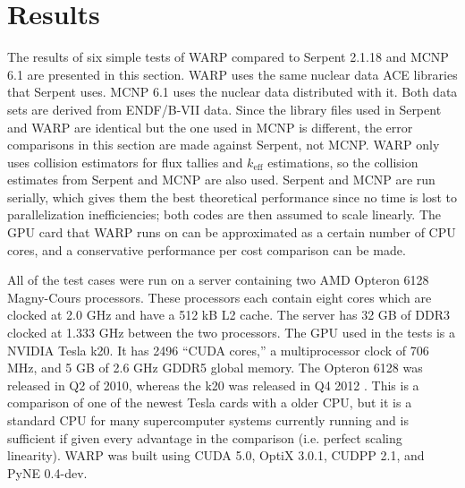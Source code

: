 \chapter{Results}
\label{chap:results}

The results of six simple tests of WARP compared to Serpent 2.1.18 and MCNP 6.1 are presented in this section.  WARP uses the same nuclear data ACE libraries that Serpent uses.  MCNP 6.1 uses the nuclear data distributed with it.  Both data sets are derived from ENDF/B-VII data. Since the library files used in Serpent and WARP are identical but the one used in MCNP is different, the error comparisons in this section are made against Serpent, not MCNP.  WARP only uses collision estimators for flux tallies and $k_\mathrm{eff}$ estimations, so the collision estimates from Serpent and MCNP are also used.  %
Serpent and MCNP are run serially, which gives them the best theoretical performance since no time is lost to parallelization inefficiencies; both codes are then assumed to scale linearly.  The GPU card that WARP runs on can be approximated as a certain number of CPU cores, and a conservative performance per cost comparison can be made.

All of the test cases were run on a server containing two AMD Opteron 6128 Magny-Cours processors.  These processors each contain eight cores which are clocked at 2.0 GHz and have a 512 kB L2 cache.  The server has 32 GB of DDR3 clocked at 1.333 GHz between the two processors.  The GPU used in the tests is a NVIDIA Tesla k20.  It has 2496 ``CUDA cores,'' a multiprocessor clock of 706 MHz, and 5 GB of 2.6 GHz GDDR5 global memory.  The Opteron 6128 was released in Q2 of 2010, whereas the k20 was released in Q4 2012 \cite{opterondate,k20date}.  This is a comparison of one of the newest Tesla cards with a older CPU, but it is a standard CPU for many supercomputer systems currently running and is sufficient if given every advantage in the comparison (i.e. perfect scaling linearity).  WARP was built using CUDA 5.0, OptiX 3.0.1, CUDPP 2.1, and PyNE 0.4-dev.

